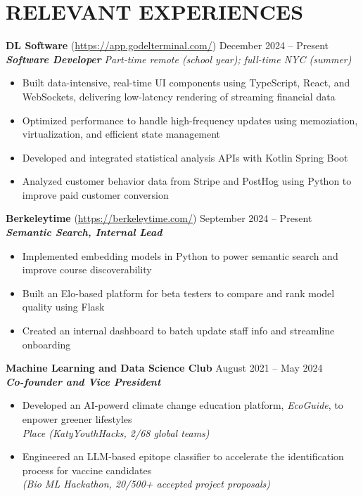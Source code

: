 \section*{RELEVANT EXPERIENCES}

\noindent
\textbf{DL Software} (\href{https://app.godelterminal.com/}{https://app.godelterminal.com/}) \hfill December 2024 -- Present \\
\textbf{\textit{Software Developer}} \hfill \textit{Part-time remote (school year); full-time NYC (summer)}
\begin{itemize}
	\item Built data-intensive, real-time UI components using TypeScript, React, and WebSockets, delivering low-latency rendering of streaming financial data
	\item Optimized performance to handle high-frequency updates using memoziation, virtualization, and efficient state management
	\item Developed and integrated statistical analysis APIs with Kotlin Spring Boot
	\item Analyzed customer behavior data from Stripe and PostHog using Python to improve paid customer conversion
\end{itemize}

\noindent
\textbf{Berkeleytime} (\href{https://berkeleytime.com/}{https://berkeleytime.com/}) \hfill September 2024 -- Present \\
\textbf{\textit{Semantic Search, Internal Lead}}
\begin{itemize}
	\item Implemented embedding models in Python to power semantic search and improve course discoverability
	\item Built an Elo-based platform for beta testers to compare and rank model quality using Flask
	\item Created an internal dashboard to batch update staff info and streamline onboarding
\end{itemize}

\noindent
\textbf{Machine Learning and Data Science Club} \hfill August 2021 -- May 2024 \\
\textbf{\textit{Co-founder and Vice President}}
\begin{itemize}
	\item Developed an AI-powerd climate change education platform, \textit{EcoGuide}, to enpower greener lifestyles \\ \textit{ Place (KatyYouthHacks, 2/68 global teams)}
	\item Engineered an LLM-based epitope classifier to accelerate the identification process for vaccine candidates \\ \textit{(Bio ML Hackathon, 20/500+ accepted project proposals)}
\end{itemize}

